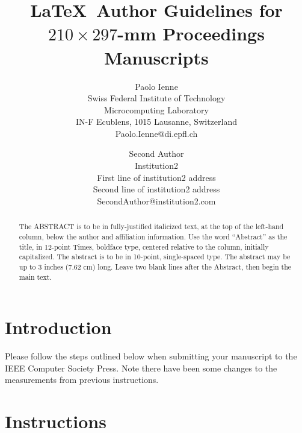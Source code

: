 \documentclass[10pt,twocolumn]{IEEEtran}
\begin{document}
\title{\LaTeX\ Author Guidelines
       for {\boldmath $210 \times 297$-mm} Proceedings Manuscripts}

\author{Paolo Ienne\\
Swiss Federal Institute of Technology\\ Microcomputing Laboratory \\ IN-F
Ecublens, 1015 Lausanne, Switzerland\\ Paolo.Ienne@di.epfl.ch\\
\and
Second Author\\
Institution2\\
First line of institution2 address\\ Second line of institution2 address\\
SecondAuthor@institution2.com\\
}

\maketitle
\thispagestyle{empty}

\begin{abstract}
   The ABSTRACT is to be in fully-justified italicized text, at the top
   of the left-hand column, below the author and affiliation
   information. Use the word ``Abstract'' as the title, in 12-point
   Times, boldface type, centered relative to the column, initially
   capitalized. The abstract is to be in 10-point, single-spaced type.
   The abstract may be up to 3 inches (7.62 cm) long. Leave two blank
   lines after the Abstract, then begin the main text.
\end{abstract}



\section{Introduction}

Please follow the steps outlined below when submitting your
manuscript to the IEEE Computer Society Press. Note there have
been some changes to the measurements from previous instructions.

\section{Instructions}
\end{document}
